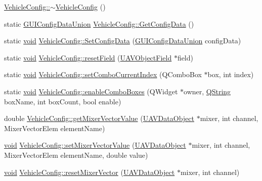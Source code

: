 \begin{DoxyCompactItemize}
\item 
\hyperlink{group___config_plugin_ga440451fa05e53fc37b5dfafc439cd681}{\-Vehicle\-Config\-::$\sim$\-Vehicle\-Config} ()
\item 
static \hyperlink{union_g_u_i_config_data_union}{\-G\-U\-I\-Config\-Data\-Union} \hyperlink{group___config_plugin_gae2c0e1bb819f6b9c95402cea8702e177}{\-Vehicle\-Config\-::\-Get\-Config\-Data} ()
\item 
static \hyperlink{group___u_a_v_objects_plugin_ga444cf2ff3f0ecbe028adce838d373f5c}{void} \hyperlink{group___config_plugin_ga0a6981811a5b0f3c144bde081c414da0}{\-Vehicle\-Config\-::\-Set\-Config\-Data} (\hyperlink{union_g_u_i_config_data_union}{\-G\-U\-I\-Config\-Data\-Union} config\-Data)
\item 
static \hyperlink{group___u_a_v_objects_plugin_ga444cf2ff3f0ecbe028adce838d373f5c}{void} \hyperlink{group___config_plugin_ga5d58a26e503e6a3d9a565932148036ce}{\-Vehicle\-Config\-::reset\-Field} (\hyperlink{class_u_a_v_object_field}{\-U\-A\-V\-Object\-Field} $\ast$field)
\item 
static \hyperlink{group___u_a_v_objects_plugin_ga444cf2ff3f0ecbe028adce838d373f5c}{void} \hyperlink{group___config_plugin_ga56c01e65c75f32c462e8a5191fabffce}{\-Vehicle\-Config\-::set\-Combo\-Current\-Index} (\-Q\-Combo\-Box $\ast$box, int index)
\item 
static \hyperlink{group___u_a_v_objects_plugin_ga444cf2ff3f0ecbe028adce838d373f5c}{void} \hyperlink{group___config_plugin_ga80929dea8a5f354f9d7df8162e027b29}{\-Vehicle\-Config\-::enable\-Combo\-Boxes} (\-Q\-Widget $\ast$owner, \hyperlink{group___u_a_v_objects_plugin_gab9d252f49c333c94a72f97ce3105a32d}{\-Q\-String} box\-Name, int box\-Count, bool enable)
\item 
double \hyperlink{group___config_plugin_ga0d65103b0dfd7aa3d3fca584cdda0a3f}{\-Vehicle\-Config\-::get\-Mixer\-Vector\-Value} (\hyperlink{class_u_a_v_data_object}{\-U\-A\-V\-Data\-Object} $\ast$mixer, int channel, \-Mixer\-Vector\-Elem element\-Name)
\item 
\hyperlink{group___u_a_v_objects_plugin_ga444cf2ff3f0ecbe028adce838d373f5c}{void} \hyperlink{group___config_plugin_ga1c43f32f9f928991460ed7491d048ca1}{\-Vehicle\-Config\-::set\-Mixer\-Vector\-Value} (\hyperlink{class_u_a_v_data_object}{\-U\-A\-V\-Data\-Object} $\ast$mixer, int channel, \-Mixer\-Vector\-Elem element\-Name, double value)
\item 
\hyperlink{group___u_a_v_objects_plugin_ga444cf2ff3f0ecbe028adce838d373f5c}{void} \hyperlink{group___config_plugin_ga0e4c15b064550ea0899ed4e641ebb635}{\-Vehicle\-Config\-::reset\-Mixer\-Vector} (\hyperlink{class_u_a_v_data_object}{\-U\-A\-V\-Data\-Object} $\ast$mixer, int channel)

\end{DoxyCompactItemize}
